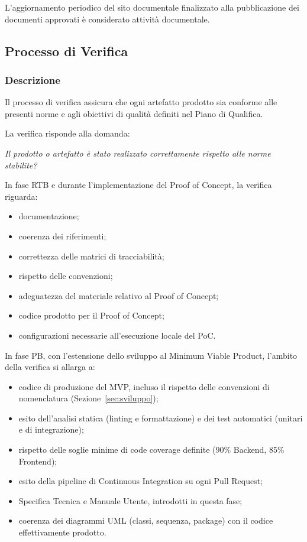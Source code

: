 L'aggiornamento periodico del sito documentale finalizzato alla pubblicazione
dei documenti approvati è considerato attività documentale.


\subsection{Processo di Verifica}
\label{sec:verifica}

\subsubsection{Descrizione}

Il processo di verifica assicura che ogni artefatto prodotto sia conforme alle
presenti norme e agli obiettivi di qualità definiti nel Piano di Qualifica.

La verifica risponde alla domanda:

\begin{center}
    \textit{Il prodotto o artefatto è stato realizzato correttamente rispetto alle norme stabilite?}
\end{center}

In fase RTB e durante l'implementazione del Proof of Concept, la verifica riguarda:

\begin{itemize}
    \item documentazione;
    \item coerenza dei riferimenti;
    \item correttezza delle matrici di tracciabilità;
    \item rispetto delle convenzioni;
    \item adeguatezza del materiale relativo al Proof of Concept;
    \item codice prodotto per il Proof of Concept;
    \item configurazioni necessarie all'esecuzione locale del PoC.
\end{itemize}

In fase PB, con l'estensione dello sviluppo al Minimum Viable Product, l'ambito della verifica si allarga a:

\begin{itemize}
    \item codice di produzione del MVP, incluso il rispetto delle convenzioni di nomenclatura (Sezione~\ref{sec:sviluppo});
    \item esito dell'analisi statica (linting e formattazione) e dei test automatici (unitari e di integrazione);
    \item rispetto delle soglie minime di code coverage definite (90\% Backend, 85\% Frontend);
    \item esito della pipeline di Continuous Integration su ogni Pull Request;
    \item Specifica Tecnica e Manuale Utente, introdotti in questa fase;
    \item coerenza dei diagrammi UML (classi, sequenza, package) con il codice effettivamente prodotto.
\end{itemize}

